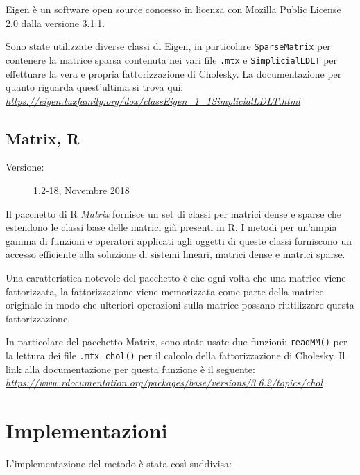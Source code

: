 \documentclass[preprint,12pt]{elsarticle}
\begin{document}
Eigen è un software open source concesso in licenza con Mozilla Public License 2.0 dalla versione 3.1.1.

Sono state utilizzate diverse classi di Eigen, in particolare \texttt{SparseMatrix} per contenere la matrice sparsa contenuta nei vari file \texttt{.mtx} e \texttt{SimplicialLDLT} per effettuare la vera e propria fattorizzazione di Cholesky.
La documentazione per quanto riguarda quest'ultima si trova qui:\\
\textit{\href{https://eigen.tuxfamily.org/dox/classEigen_1_1SimplicialLDLT.html}{https://eigen.tuxfamily.org/dox/classEigen\_1\_1SimplicialLDLT.html} }


\subsection{Matrix, R}
\medskip
\begin{description}
	\item[Versione:] 1.2-18, Novembre 2018
\end{description}

Il pacchetto di R \textit{Matrix} fornisce un set di classi per matrici dense e sparse che estendono le classi base delle matrici già presenti in R. I metodi per un'ampia gamma di funzioni e operatori applicati agli oggetti di queste classi forniscono un accesso efficiente alla soluzione di sistemi lineari, matrici dense e matrici sparse.

Una caratteristica notevole del pacchetto è che ogni volta che una matrice viene fattorizzata, la fattorizzazione viene memorizzata come parte della matrice originale in modo che ulteriori operazioni sulla matrice possano riutilizzare questa fattorizzazione.

In particolare del pacchetto Matrix, sono state usate due funzioni: \texttt{readMM()} per la lettura dei file \texttt{.mtx}, \texttt{chol()} per il calcolo della fattorizzazione di Cholesky.
Il link alla documentazione per questa funzione è il seguente:\\
\textit{\href{https://www.rdocumentation.org/packages/base/versions/3.6.2/topics/chol}{https://www.rdocumentation.org/packages/base/versions/3.6.2/topics/chol}
}
\newpage


\section{Implementazioni}

L'implementazione del metodo è stata così suddivisa:
\end{document}
